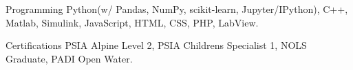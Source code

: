 

\begin{cvskills}

  \cvskill
    {Programming} %
    {Python(w/ Pandas, NumPy, scikit-learn, Jupyter/IPython), C++, Matlab, Simulink, JavaScript, HTML, CSS, PHP, LabView.}  %

  \cvskill
    {Certifications} %
    {PSIA Alpine Level 2, PSIA Childrens Specialist 1, NOLS Graduate, PADI Open Water.} %

\end{cvskills}
